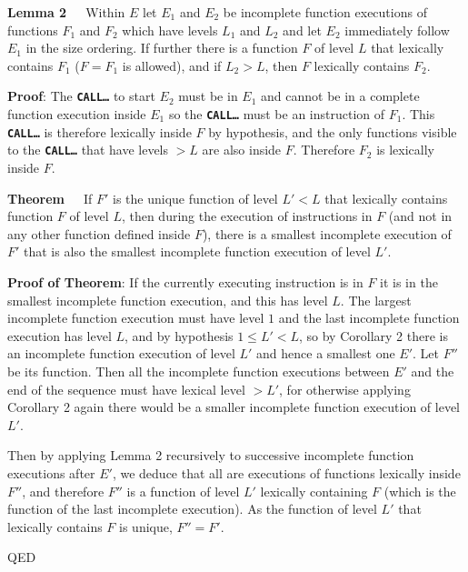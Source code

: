 \documentclass[12pt]{article}
\newcommand{\TT}[1]{{\tt \bfseries #1}}
\newenvironment{indpar}[1][0.3in]%
	{\begin{list}{}%
		     {\setlength{\itemsep}{0in}%
		      \setlength{\topsep}{0in}%
		      \setlength{\parsep}{1ex}%
		      \setlength{\labelwidth}{#1}%
		      \setlength{\leftmargin}{#1}%
		      \addtolength{\leftmargin}{\labelsep}}%
	 \item}%
	{\end{list}}
\begin{document}
\begin{indpar}
{\bf Lemma 2}~~~Within $E$
let $E_1$ and $E_2$ be incomplete function
executions of functions $F_1$ and $F_2$ which have levels $L_1$ and $L_2$
and let  $E_2$ immediately follow $E_1$ in the size
ordering.  If further there is a function $F$ of level $L$ that lexically
contains $F_1$ ($F=F_1$ is allowed), and if $L_2>L$, then $F$ lexically contains
$F_2$.
\end{indpar}
\begin{indpar}
{\bf Proof}: The \TT{CALL\ldots} to start $E_2$ must be in $E_1$
and cannot be in a complete function execution inside $E_1$ so
the \TT{CALL\ldots} must be an instruction of $F_1$.  This \TT{CALL\ldots}
is therefore lexically inside $F$ by hypothesis, and the only functions visible
to the \TT{CALL\ldots} that have levels $>L$ are also inside $F$.
Therefore $F_2$ is lexically inside $F$.
\end{indpar}

\begin{indpar}
{\bf Theorem}~~~If $F'$ is the unique function of level $L' < L$ that lexically
contains function $F$ of level $L$,
then during the execution of instructions in $F$ (and not in any other
function defined inside $F$),
there is a smallest incomplete execution of $F'$ that is also
the smallest incomplete function execution of level $L'$.
\end{indpar}

\begin{indpar}
{\bf Proof of Theorem}: If the currently executing instruction is in $F$
it is in the smallest incomplete function execution, and this has level $L$.
The largest incomplete function execution
must have level $1$ and the last incomplete function execution has level
$L$, and by hypothesis $1\leq L'<L$,
so by Corollary 2 there is an incomplete function execution of level $L'$
and hence a smallest one $E'$.  Let $F''$ be its function.  Then all the
incomplete function executions between $E'$ and the end of the sequence
must have lexical level $>L'$, for otherwise applying Corollary 2 again
there would be a smaller incomplete function execution of level $L'$.

Then by applying Lemma 2 recursively to successive incomplete function
executions after $E'$, we deduce that all are executions of functions
lexically inside $F''$, and therefore $F''$ is a function of
level $L'$ lexically containing $F$ (which is the function of the
last incomplete execution).  As the function of level $L'$
that lexically contains $F$ is unique, $F''=F'$.

QED
\end{indpar}
\end{document}
